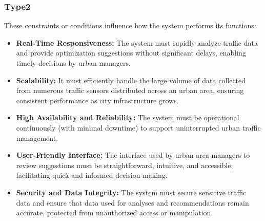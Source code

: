 \documentclass[a4paper,12pt]{article}
\begin{document}
\subsubsection*{Type2}
These constraints or conditions influence how the system performs its functions:
\begin{itemize}
    \item \textbf{Real-Time Responsiveness:}  
    The system must rapidly analyze traffic data and provide optimization suggestions without significant delays, enabling timely decisions by urban managers.

    \item \textbf{Scalability:}  
    It must efficiently handle the large volume of data collected from numerous traffic sensors distributed across an urban area, ensuring consistent performance as city infrastructure grows.

    \item \textbf{High Availability and Reliability:}  
    The system must be operational continuously (with minimal downtime) to support uninterrupted urban traffic management.

    \item \textbf{User-Friendly Interface:}  
    The interface used by urban area managers to review suggestions must be straightforward, intuitive, and accessible, facilitating quick and informed decision-making.

    \item \textbf{Security and Data Integrity:}  
    The system must secure sensitive traffic data and ensure that data used for analyses and recommendations remain accurate, protected from unauthorized access or manipulation.
\end{itemize}
\end{document}
